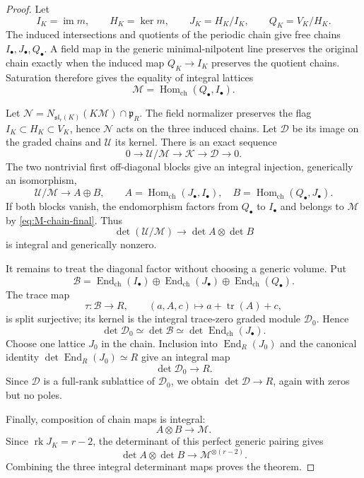 \documentclass[11pt]{article}
\theoremstyle{definition}
\newcommand{\Mcal}{\mathcal M}
\newcommand{\Ucal}{\mathcal U}
\newcommand{\Kcal}{\mathcal K}
\newcommand{\Ncal}{\mathcal N}
\newcommand{\Dcal}{\mathcal D}
\newcommand{\Bcal}{\mathcal B}
\newcommand{\rk}{\operatorname{rk}}
\newcommand{\im}{\operatorname{im}}
\newcommand{\Hom}{\operatorname{Hom}}
\newcommand{\End}{\operatorname{End}}
\newcommand{\tr}{\operatorname{tr}}
\begin{document}
\begin{proof}
Let
\[
 I_K=\im m,
 \qquad H_K=\ker m,
 \qquad J_K=H_K/I_K,
 \qquad Q_K=V_K/H_K.
\]
The induced intersections and quotients of the periodic chain give free
chains $I_\bullet,J_\bullet,Q_\bullet$.  A field map in the generic
minimal-nilpotent line preserves the original chain exactly when the induced
map $Q_K\to I_K$ preserves the quotient chains.  Saturation therefore gives
the equality of integral lattices
\begin{equation}\label{eq:M-chain-final}
 \Mcal=\Hom_{\mathrm{ch}}(Q_\bullet,I_\bullet).
\end{equation}

Let $\Ncal=N_{\mathfrak{sl}_r(K)}(K\Mcal)\cap\mathfrak p_R$.  The field
normalizer preserves the flag $I_K\subset H_K\subset V_K$, hence $\Ncal$
acts on the three induced chains.  Let $\Dcal$ be its image on the graded
chains and $\Ucal$ its kernel.  There is an exact sequence
\[
 0\longrightarrow\Ucal/\Mcal\longrightarrow\Kcal
 \longrightarrow\Dcal\longrightarrow0.
\]
The two nontrivial first off-diagonal blocks give an integral injection,
generically an isomorphism,
\[
 \Ucal/\Mcal\longrightarrow
 A\oplus B,
 \qquad
 A=\Hom_{\mathrm{ch}}(J_\bullet,I_\bullet),
 \quad
 B=\Hom_{\mathrm{ch}}(Q_\bullet,J_\bullet).
\]
If both blocks vanish, the endomorphism factors from $Q_\bullet$ to
$I_\bullet$ and belongs to $\Mcal$ by \eqref{eq:M-chain-final}.  Thus
\[
 \det(\Ucal/\Mcal)\longrightarrow\det A\otimes\det B
\]
is integral and generically nonzero.

It remains to treat the diagonal factor without choosing a generic volume.
Put
\[
 \Bcal=\End_{\mathrm{ch}}(I_\bullet)\oplus
       \End_{\mathrm{ch}}(J_\bullet)\oplus
       \End_{\mathrm{ch}}(Q_\bullet).
\]
The trace map
\[
 \tau:\Bcal\longrightarrow R,
 \qquad (a,A,c)\longmapsto a+\tr(A)+c,
\]
is split surjective; its kernel is the integral trace-zero graded module
$\Dcal_0$.  Hence
\[
 \det\Dcal_0\simeq\det\Bcal
 \simeq\det\End_{\mathrm{ch}}(J_\bullet).
\]
Choose one lattice $J_0$ in the chain.  Inclusion into
$\End_R(J_0)$ and the canonical identity
$\det\End_R(J_0)\simeq R$ give an integral map
\[
 \det\Dcal_0\longrightarrow R.
\]
Since $\Dcal$ is a full-rank sublattice of $\Dcal_0$, we obtain
$\det\Dcal\to R$, again with zeros but no poles.

Finally, composition of chain maps is integral:
\[
 A\otimes B\longrightarrow\Mcal.
\]
Since $\rk J_K=r-2$, the determinant of this perfect generic pairing gives
\[
 \det A\otimes\det B\longrightarrow\Mcal^{\otimes(r-2)}.
\]
Combining the three integral determinant maps proves the theorem.
\end{proof}
\end{document}
